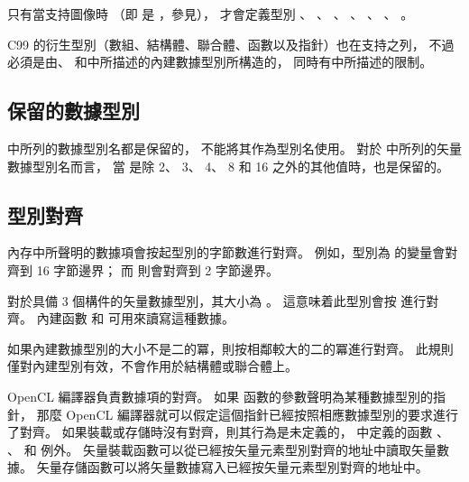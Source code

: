 只有當支持圖像時
（即  是 ，參見），
才會定義型別 、 、 、
 、 、 、
 。

C99 的衍生型別（數組、結構體、聯合體、函數以及指針）也在支持之列，
不過必須是由、
和中所描述的內建數據型別所構造的，
同時有中所描述的限制。

\subsection{保留的數據型別}

 中所列的數據型別名都是保留的，
不能將其作為型別名使用。
對於 中所列的矢量數據型別名而言，
當  是除 2、 3、 4、 8 和 16 之外的其他值時，也是保留的。


\subsection{型別對齊}

內存中所聲明的數據項會按起型別的字節數進行對齊。
例如，型別為  的變量會對齊到 16 字節邊界；
而  則會對齊到 2 字節邊界。

對於具備 3 個構件的矢量數據型別，其大小為 。
這意味着此型別會按  進行對齊。
內建函數  和  可用來讀寫這種數據。

如果內建數據型別的大小不是二的冪，則按相鄰較大的二的冪進行對齊。
此規則僅對內建型別有效，不會作用於結構體或聯合體上。

OpenCL 編譯器負責數據項的對齊。
如果  函數的參數聲明為某種數據型別的指針，
那麼 OpenCL 編譯器就可以假定這個指針已經按照相應數據型別的要求進行了對齊。
如果裝載或存儲時沒有對齊，則其行為是未定義的，
中定義的函數 、 、
  和  例外。
矢量裝載函數可以從已經按矢量元素型別對齊的地址中讀取矢量數據。
矢量存儲函數可以將矢量數據寫入已經按矢量元素型別對齊的地址中。

